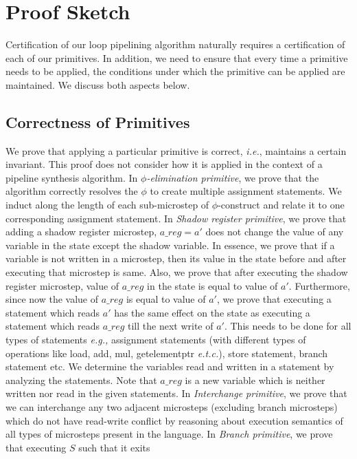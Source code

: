 \section{Proof Sketch}
\label{sec:proof}

Certification of our loop pipelining algorithm naturally requires a certification of each of our primitives. In addition, we need to ensure that every time a primitive needs to be applied, the conditions under which the primitive can be applied are maintained. We discuss both aspects below.

\subsection{Correctness of Primitives}
We prove that applying a particular primitive is correct, 
{\em i.e.}, maintains a certain invariant. This proof does not 
consider how it is applied in the context of a pipeline
synthesis algorithm. In {\em $\phi$-elimination primitive}, we prove that the algorithm 
correctly resolves the $\phi$ to create multiple assignment statements. 
We induct along the length of each sub-microstep of $\phi$-construct and
relate it to one corresponding assignment statement. 
In {\em Shadow register primitive}, we prove that adding a shadow register microstep, $a\_reg = a'$ 
does not change the value of any variable in the state except the shadow variable. In essence, we prove
that if a variable is not written in a microstep, then its value in the state before and after executing
that microstep is same. Also, we prove that after executing the shadow register microstep,
value of $a\_reg$ in the state is equal to value of $a'$. Furthermore, since now
the value of $a\_reg$ is equal to value of $a'$, we prove that executing a statement which reads $a'$ has the same
effect on the state as executing a statement which reads $a\_reg$ till the next write of $a'$. This needs to be done for all types of
  statements {\em e.g.,} assignment statements (with different types of 
  operations like load, add, mul, getelementptr {\em e.t.c.}), 
  store statement, branch statement etc. We determine the variables read and 
  written in a statement by analyzing the statements. 
  Note that $a\_reg$ is a new variable which
  is neither written nor read in the given statements. In {\em Interchange primitive}, we prove 
  that we can interchange any two adjacent microsteps
 (excluding branch microsteps) which do not have read-write conflict by reasoning about execution
  semantics of all types of microsteps present in the
  language. In {\em Branch primitive}, we prove that executing $S$ such that it exits 
